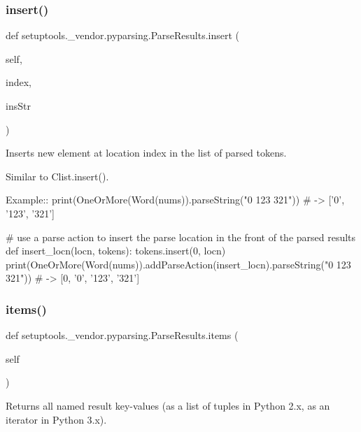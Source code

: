 \subsubsection{\texorpdfstring{insert()}{insert()}}
{\footnotesize\ttfamily def setuptools.\+\_\+vendor.\+pyparsing.\+Parse\+Results.\+insert (\begin{DoxyParamCaption}\item[{}]{self,  }\item[{}]{index,  }\item[{}]{ins\+Str }\end{DoxyParamCaption})}

\begin{DoxyVerb}Inserts new element at location index in the list of parsed tokens.

Similar to C{list.insert()}.

Example::
    print(OneOrMore(Word(nums)).parseString("0 123 321")) # -> ['0', '123', '321']

    # use a parse action to insert the parse location in the front of the parsed results
    def insert_locn(locn, tokens):
tokens.insert(0, locn)
    print(OneOrMore(Word(nums)).addParseAction(insert_locn).parseString("0 123 321")) # -> [0, '0', '123', '321']
\end{DoxyVerb}
 \mbox{\label{classsetuptools_1_1__vendor_1_1pyparsing_1_1_parse_results_a6b2179c3bd82a9570a615a71d2f90fdb}} 
\subsubsection{\texorpdfstring{items()}{items()}}
{\footnotesize\ttfamily def setuptools.\+\_\+vendor.\+pyparsing.\+Parse\+Results.\+items (\begin{DoxyParamCaption}\item[{}]{self }\end{DoxyParamCaption})}

\begin{DoxyVerb}Returns all named result key-values (as a list of tuples in Python 2.x, as an iterator in Python 3.x).\end{DoxyVerb}
 \mbox{\label{classsetuptools_1_1__vendor_1_1pyparsing_1_1_parse_results_afe6765f5f4372b21e973fb235bdd179c}} 
